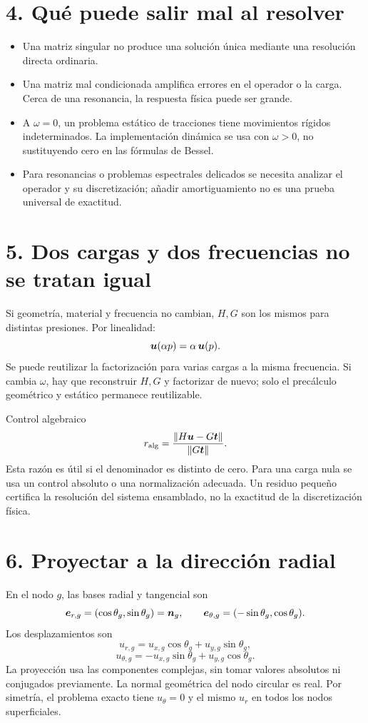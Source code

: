\documentclass[11pt]{article}
\begin{document}
\section*{4. Qué puede salir mal al resolver}
\begin{itemize}
 \item Una matriz singular no produce una solución única mediante una
 resolución directa ordinaria.
 \item Una matriz mal condicionada amplifica errores en el operador o la
 carga. Cerca de una resonancia, la respuesta física puede ser grande.
 \item A \(\omega=0\), un problema estático de tracciones tiene movimientos
 rígidos indeterminados. La implementación dinámica se usa con
 \(\omega>0\), no sustituyendo cero en las fórmulas de Bessel.
 \item Para resonancias o problemas espectrales delicados se necesita
 analizar el operador y su discretización; añadir amortiguamiento no es
 una prueba universal de exactitud.
\end{itemize}

\section*{5. Dos cargas y dos frecuencias no se tratan igual}
Si geometría, material y frecuencia no cambian, \(H,G\) son los mismos para
distintas presiones. Por linealidad:
\[
 \bm{u}(\alpha p)=\alpha\,\bm{u}(p).
\]
Se puede reutilizar la factorización para varias cargas a la misma
frecuencia. Si cambia \(\omega\), hay que reconstruir \(H,G\) y factorizar
de nuevo; solo el precálculo geométrico y estático permanece reutilizable.

\begin{resultado}{Control algebraico}
\[
 r_{\mathrm{alg}}=
 \frac{\left\lVert H\bm{u}-G\bm{t}\right\rVert}{\left\lVert G\bm{t}\right\rVert}.
\]
Esta razón es útil si el denominador es distinto de cero. Para una carga
nula se usa un control absoluto o una normalización adecuada.
Un residuo pequeño certifica la resolución del sistema ensamblado,
no la exactitud de la discretización física.
\end{resultado}

\newpage
\section*{6. Proyectar a la dirección radial}
En el nodo \(g\), las bases radial y tangencial son
\[
 \bm{e}_{r,g}=(\cos\theta_g,\sin\theta_g)=\bm{n}_g,\qquad
 \bm{e}_{\theta,g}=(-\sin\theta_g,\cos\theta_g).
\]
Los desplazamientos son
\[
 \boxed{u_{r,g}=u_{x,g}\cos\theta_g+u_{y,g}\sin\theta_g,}
\]
\[
 u_{\theta,g}=-u_{x,g}\sin\theta_g+u_{y,g}\cos\theta_g.
\]
La proyección usa las componentes complejas, sin tomar valores absolutos
ni conjugados previamente. La normal geométrica del nodo circular es real.
Por simetría, el problema exacto tiene \(u_\theta=0\) y el mismo \(u_r\)
en todos los nodos superficiales.
\end{document}
